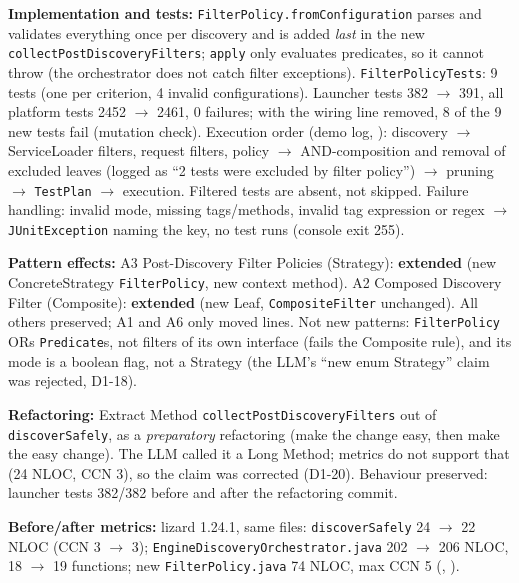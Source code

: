 \documentclass[11pt,a4paper]{article}
\newcommand{\entry}[1]{\textbf{#1:} }
\begin{document}
\entry{Implementation and tests}\texttt{FilterPolicy.fromConfiguration} parses and validates everything once per discovery and is added \emph{last} in the new \texttt{collectPostDiscoveryFilters}; \texttt{apply} only evaluates predicates, so it cannot throw (the orchestrator does not catch filter exceptions). \texttt{FilterPolicyTests}: 9 tests (one per criterion, 4 invalid configurations). Launcher tests 382 $\rightarrow$ 391, all platform tests 2452 $\rightarrow$ 2461, 0 failures; with the wiring line removed, 8 of the 9 new tests fail (mutation check). Execution order (demo log, ): discovery $\rightarrow$ ServiceLoader filters, request filters, policy $\rightarrow$ AND-composition and removal of excluded leaves (logged as ``2 tests were excluded by filter policy'') $\rightarrow$ pruning $\rightarrow$ \texttt{TestPlan} $\rightarrow$ execution. Filtered tests are absent, not skipped. Failure handling: invalid mode, missing tags/methods, invalid tag expression or regex $\rightarrow$ \texttt{JUnitException} naming the key, no test runs (console exit 255).

\entry{Pattern effects}A3 Post-Discovery Filter Policies (Strategy): \textbf{extended} (new ConcreteStrategy \texttt{FilterPolicy}, new context method). A2 Composed Discovery Filter (Composite): \textbf{extended} (new Leaf, \texttt{CompositeFilter} unchanged). All others preserved; A1 and A6 only moved lines. Not new patterns: \texttt{FilterPolicy} ORs \texttt{Predicate}s, not filters of its own interface (fails the Composite rule), and its mode is a boolean flag, not a Strategy (the LLM's ``new enum Strategy'' claim was rejected, D1-18).

\entry{Refactoring}Extract Method \texttt{collectPostDiscoveryFilters} out of \texttt{discoverSafely}, as a \emph{preparatory} refactoring (make the change easy, then make the easy change). The LLM called it a Long Method; metrics do not support that (24 NLOC, CCN 3), so the claim was corrected (D1-20). Behaviour preserved: launcher tests 382/382 before and after the refactoring commit.

\entry{Before/after metrics}lizard 1.24.1, same files: \texttt{discoverSafely} 24 $\rightarrow$ 22 NLOC (CCN 3 $\rightarrow$ 3); \texttt{EngineDiscoveryOrchestrator.java} 202 $\rightarrow$ 206 NLOC, 18 $\rightarrow$ 19 functions; new \texttt{FilterPolicy.java} 74 NLOC, max CCN 5 (, ).
\end{document}
